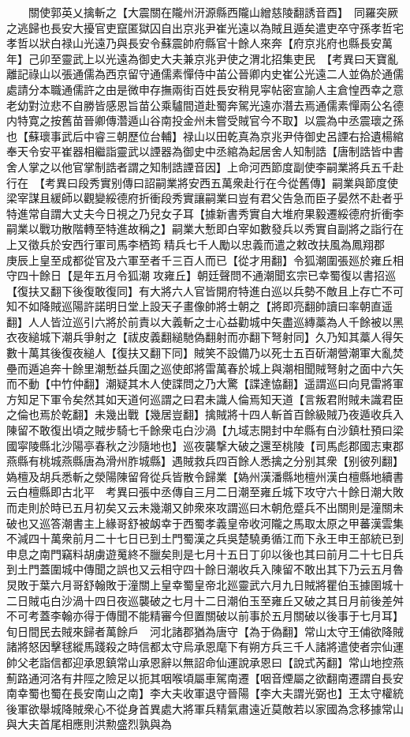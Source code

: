 　　關使郭英乂擒斬之【大震關在隴州汧源縣西隴山繒慈陵翻誘音酉】　同羅突厥之逃歸也長安大擾官吏竄匿獄囚自出京兆尹崔光遠以為賊且遁矣遣吏卒守孫孝哲宅孝哲以狀白禄山光遠乃與長安令蘇震帥府縣官十餘人來奔【府京兆府也縣長安萬年】己卯至靈武上以光遠為御史大夫兼京兆尹使之渭北招集吏民　【考異曰天寶亂離記祿山以張通儒為西京留守通儒素憚侍中苖公晉卿内史崔公光遠二人並偽於通儒處請分本職通儒許之由是微申存撫兩街百姓長安稍見寜帖密宣諭人主倉惶西幸之意老幼對泣悲不自勝皆感恩旨苗公乘驢間道赴蜀奔駕光遠亦潛去焉通儒素憚兩公名德内特寛之按舊苗晉卿傳濳遁山谷南投金州未嘗受賊官今不取】以震為中丞震瓌之孫也【蘇瓌事武后中睿三朝歷位台輔】禄山以田乾真為京兆尹侍御史呂諲右拾遺楊綰奉天令安平崔器相繼詣靈武以諲器為御史中丞綰為起居舍人知制誥【唐制誥皆中書舍人掌之以他官掌制誥者謂之知制誥諲音因】上命河西節度副使李嗣業將兵五千赴行在　【考異曰段秀實别傳曰詔嗣業將安西五萬衆赴行在今從舊傳】嗣業與節度使梁宰謀且緩師以觀變綏德府折衝段秀實讓嗣業曰豈有君父告急而臣子晏然不赴者乎特進常自謂大丈夫今日視之乃兒女子耳【據新書秀實自大堆府果毅遷綏德府折衝李嗣業以戰功散階轉至特進故稱之】嗣業大慙即白宰如數發兵以秀實自副將之詣行在上又徵兵於安西行軍司馬李栖筠精兵七千人勵以忠義而遣之敕改扶風為鳳翔郡　庚辰上皇至成都從官及六軍至者千三百人而已【從才用翻】令狐潮圍張廵於雍丘相守四十餘日【是年五月令狐潮攻雍丘】朝廷聲問不通潮聞玄宗已幸蜀復以書招巡【復扶又翻下後復敢復同】有大將六人官皆開府特進白巡以兵勢不敵且上存亡不可知不如降賊巡陽許諾明日堂上設天子畫像帥將士朝之【將即亮翻帥讀曰率朝直遥翻】人人皆泣巡引六將於前責以大義斬之士心益勸城中矢盡巡縳藁為人千餘被以黑衣夜縋城下潮兵爭射之【祓皮義翻縋馳偽翻射而亦翻下弩射同】久乃知其藁人得矢數十萬其後復夜縋人【復扶又翻下同】賊笑不設備乃以死士五百斫潮營潮軍大亂焚壘而遁追奔十餘里潮慙益兵圍之巡使郎將雷萬春於城上與潮相聞賊弩射之面中六矢而不動【中竹仲翻】潮疑其木人使諜問之乃大驚【諜達恊翻】遥謂巡曰向見雷將軍方知足下軍令矣然其如天道何巡謂之曰君未識人倫焉知天道【言叛君附賊未識君臣之倫也焉於乾翻】未幾出戰【幾居豈翻】擒賊將十四人斬首百餘級賊乃夜遁收兵入陳留不敢復出頃之賊步騎七千餘衆屯白沙渦【九域志開封中牟縣有白沙鎮杜預曰梁國寜陵縣北沙陽亭春秋之沙隨地也】巡夜襲撃大破之還至桃陵【司馬彪郡國志東郡燕縣有桃城燕縣唐為滑州胙城縣】遇賊救兵四百餘人悉擒之分别其衆【别彼列翻】媯檀及胡兵悉斬之滎陽陳留脅從兵皆散令歸業【媯州漢潘縣地檀州漢白檀縣地續書云白檀縣即古北平　考異曰張中丞傳自三月二日潮至雍丘城下攻守六十餘日潮大敗而走則於時已五月初矣又云未幾潮又帥衆來攻謂巡曰木朝危蹙兵不出關則是潼關未破也又巡答潮書主上緣哥舒被衂幸于西蜀孝義皇帝收河隴之馬取太原之甲蕃漢雲集不減四十萬衆前月二十七日已到土門蜀漢之兵吳楚驍勇循江而下永王申王部統已到申息之南門竊料胡虜遊䰟終不臘矣則是七月十五日丁卯以後也其曰前月二十七日兵到土門蓋圍城中傳聞之誤也又云相守四十餘日潮收兵入陳留不敢出其下乃云五月魯炅敗于葉六月哥舒翰敗于潼關上皇幸蜀皇帝北廵靈武六月九日賊將瞿伯玉據圉城十二日賊屯白沙渦十四日夜巡襲破之七月十二日潮伯玉至雍丘又破之其日月前後差舛不可考蓋李翰亦得于傳聞不能精審今但置關破以前事於五月關破以後事于七月耳】旬日間民去賊來歸者萬餘戶　河北諸郡猶為唐守【為于偽翻】常山太守王俌欲降賊諸將怒因擊毬縱馬踐殺之時信都太守烏承恩麾下有朔方兵三千人諸將遣使者宗仙運帥父老詣信都迎承恩鎮常山承恩辭以無詔命仙運說承恩曰【說式芮翻】常山地控燕薊路通河洛有井陘之險足以扼其咽喉頃屬車駕南遷【咽音煙屬之欲翻南遷謂自長安南幸蜀也蜀在長安南山之南】李大夫收軍退守晉陽【李大夫謂光弼也】王太守權統後軍欲舉城降賊衆心不從身首異處大將軍兵精氣肅遠近莫敵若以家國為念移據常山與大夫首尾相應則洪勲盛烈孰與為